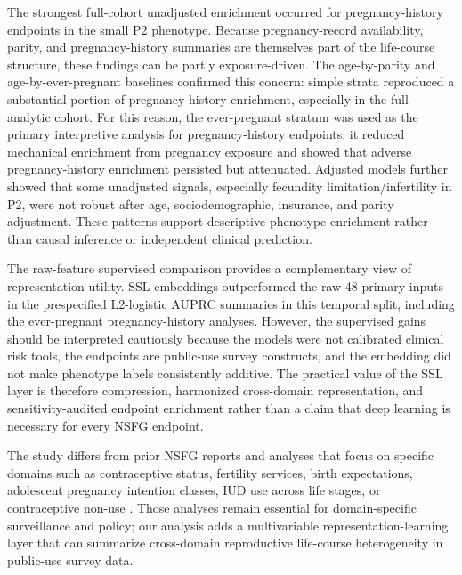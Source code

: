 \documentclass[referee,pdflatex,sn-basic,Numbered]{sn-jnl}
\begin{document}
The strongest full-cohort unadjusted enrichment occurred for pregnancy-history endpoints in the small P2 phenotype. Because pregnancy-record availability, parity, and pregnancy-history summaries are themselves part of the life-course structure, these findings can be partly exposure-driven. The age-by-parity and age-by-ever-pregnant baselines confirmed this concern: simple strata reproduced a substantial portion of pregnancy-history enrichment, especially in the full analytic cohort. For this reason, the ever-pregnant stratum was used as the primary interpretive analysis for pregnancy-history endpoints: it reduced mechanical enrichment from pregnancy exposure and showed that adverse pregnancy-history enrichment persisted but attenuated. Adjusted models further showed that some unadjusted signals, especially fecundity limitation/infertility in P2, were not robust after age, sociodemographic, insurance, and parity adjustment. These patterns support descriptive phenotype enrichment rather than causal inference or independent clinical prediction.

The raw-feature supervised comparison provides a complementary view of representation utility. SSL embeddings outperformed the raw 48 primary inputs in the prespecified L2-logistic AUPRC summaries in this temporal split, including the ever-pregnant pregnancy-history analyses. However, the supervised gains should be interpreted cautiously because the models were not calibrated clinical risk tools, the endpoints are public-use survey constructs, and the embedding did not make phenotype labels consistently additive. The practical value of the SSL layer is therefore compression, harmonized cross-domain representation, and sensitivity-audited endpoint enrichment rather than a claim that deep learning is necessary for every NSFG endpoint.

The study differs from prior NSFG reports and analyses that focus on specific domains such as contraceptive status, fertility services, birth expectations, adolescent pregnancy intention classes, IUD use across life stages, or contraceptive non-use \cite{cdc_db539,cdc_db542,cdc_db560,adolescent_lca,iud_lifecourse,contraceptive_nonuse}. Those analyses remain essential for domain-specific surveillance and policy; our analysis adds a multivariable representation-learning layer that can summarize cross-domain reproductive life-course heterogeneity in public-use survey data.
\end{document}
